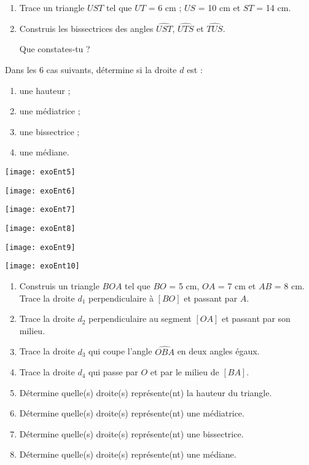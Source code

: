 \begin{exercice}
\begin{enumerate}
\item Trace un triangle $UST$ tel que $UT$ = 6 cm ; $US$ = 10 cm et $ST$ = 14 cm.
\item Construis les bissectrices des angles $\widehat{UST}$, $\widehat{UTS}$ et $\widehat{TUS}$.

Que constates‑tu ?
\end{enumerate}
\end{exercice} 




\begin{exercice}
Dans les 6 cas suivants, détermine si la droite $d$ est :
\begin{enumerate}
\item une hauteur ;
\item une médiatrice ;
\item une bissectrice ;
\item une médiane.
\end{enumerate}

\begin{colenumerate}{3}
\item \texttt{[image: exoEnt5]}
\item \texttt{[image: exoEnt6]}
\item \texttt{[image: exoEnt7]}
\item \texttt{[image: exoEnt8]}
\item \texttt{[image: exoEnt9]} 
\item \texttt{[image: exoEnt10]}
\end{colenumerate}
\end{exercice}




\begin{exercice}[Vocabulaire]
\begin{enumerate}
\item Construis un triangle $BOA$ tel que $BO$ = 5 cm, $OA$ = 7 cm et $AB$ = 8 cm. Trace la droite $d_1$ perpendiculaire à $[BO]$ et passant par $A$.
\item Trace la droite $d_2$ perpendiculaire au segment $[OA]$ et passant par son milieu.
\item Trace la droite $d_3$ qui coupe l'angle $\widehat{OBA}$ en deux angles égaux.
\item Trace la droite $d_4$ qui passe par $O$ et par le milieu de $[BA]$.
\item Détermine quelle(s) droite(s) représente(nt) la hauteur du triangle.
\item Détermine quelle(s) droite(s) représente(nt) une médiatrice.
\item Détermine quelle(s) droite(s) représente(nt) une bissectrice.
\item Détermine quelle(s) droite(s) représente(nt) une médiane.
\end{enumerate}
\end{exercice}




